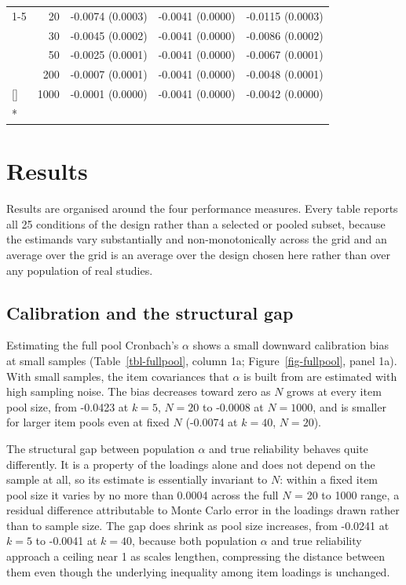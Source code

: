 \documentclass[
  nonatbib,
  authoryear,
  preprint]{elsarticle}
\begin{document}
\begin{longtable}[t]{lrrrr}
\cmidrule{1-5}\pagebreak[0]
 & 20 & -0.0074 (0.0003) & -0.0041 (0.0000) & -0.0115 (0.0003)\\
\nopagebreak
 & 30 & -0.0045 (0.0002) & -0.0041 (0.0000) & -0.0086 (0.0002)\\
\nopagebreak
 & 50 & -0.0025 (0.0001) & -0.0041 (0.0000) & -0.0067 (0.0001)\\
\nopagebreak
 & 200 & -0.0007 (0.0001) & -0.0041 (0.0000) & -0.0048 (0.0001)\\
\nopagebreak
\multirow[t]{-4}{*}[\normalbaselineskip]{\raggedright\arraybackslash 40} & 1000 & -0.0001 (0.0000) & -0.0041 (0.0000) & -0.0042 (0.0000)\\*

\end{longtable}

\endgroup{}

\section{Results}\label{results}

Results are organised around the four performance measures. Every table
reports all 25 conditions of the design rather than a selected or pooled
subset, because the estimands vary substantially and non-monotonically
across the grid and an average over the grid is an average over the
design chosen here rather than over any population of real studies.

\subsection{Calibration and the structural
gap}\label{calibration-and-the-structural-gap}

Estimating the full pool Cronbach's \(\alpha\) shows a small downward
calibration bias at small samples (Table~\ref{tbl-fullpool}, column 1a;
Figure~\ref{fig-fullpool}, panel 1a). With small samples, the item
covariances that \(\alpha\) is built from are estimated with high
sampling noise. The bias decreases toward zero as \(N\) grows at every
item pool size, from -0.0423 at \(k = 5\), \(N = 20\) to -0.0008 at
\(N = 1000\), and is smaller for larger item pools even at fixed \(N\)
(-0.0074 at \(k = 40\), \(N = 20\)).

The structural gap between population \(\alpha\) and true reliability
behaves quite differently. It is a property of the loadings alone and
does not depend on the sample at all, so its estimate is essentially
invariant to \(N\): within a fixed item pool size it varies by no more
than 0.0004 across the full \(N\) = 20 to 1000 range, a residual
difference attributable to Monte Carlo error in the loadings drawn
rather than to sample size. The gap does shrink as pool size increases,
from -0.0241 at \(k = 5\) to -0.0041 at \(k = 40\), because both
population \(\alpha\) and true reliability approach a ceiling near 1 as
scales lengthen, compressing the distance between them even though the
underlying inequality among item loadings is unchanged.
\end{document}
